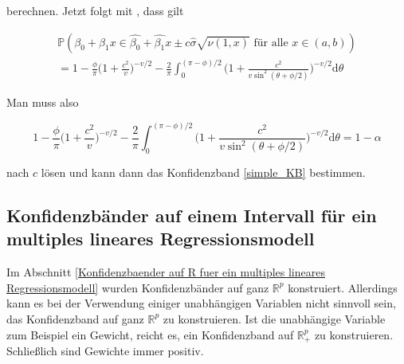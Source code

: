 \documentclass[12pt,a4paper]{article}
\theoremstyle{definition}
\theoremstyle{definition}
\theoremstyle{definition}
\theoremstyle{definition}
\begin{document}
berechnen. Jetzt folgt mit \cite{Wynn71}, dass gilt
%
%
%


\begin{eqnarray*}
\mathbb{P} \left( \beta_0 + \beta_1 x \in \hat{\beta_0} + \hat{\beta_1} x \pm c \hat{\sigma} \sqrt{\nu(1,x)} \text{ für alle } x \in (a,b) \right) \\
= 1 - \frac{\phi}{\pi} \biggl( 1 + \frac{c^2}{v} \biggr)^{ - v/2} - \frac{2}{\pi} \int^{(\pi - \phi)/2}_{0} \biggl( 1 + \frac{c^2}{v \sin^2(\theta + \phi/2)} \biggr)^{-v/2} \text{d} \theta
\end{eqnarray*}

Man muss also 

\begin{equation*}
1 - \frac{\phi}{\pi} \biggl( 1 + \frac{c^2}{v} \biggr)^{ - v/2} - \frac{2}{\pi} \int^{(\pi - \phi)/2}_{0} \biggl( 1 + \frac{c^2}{v \sin^2(\theta + \phi/2)} \biggr)^{-v/2} \text{d} \theta = 1 - \alpha
\end{equation*}

nach $c$ lösen und kann dann das Konfidenzband \eqref{simple_KB} bestimmen.





\subsection{Konfidenzbänder auf einem Intervall für ein multiples lineares Regressionsmodell}
\label{Konfidenzbaender auf einem Intervall fuer ein multiples lineares Regressionsmodell}
Im Abschnitt \ref{Konfidenzbaender auf R fuer ein multiples lineares Regressionsmodell} wurden Konfidenzbänder auf ganz $\mathbb{R}^p$ konstruiert. Allerdings kann es bei der Verwendung einiger unabhängigen Variablen nicht sinnvoll sein, das Konfidenzband auf ganz $\mathbb{R}^{p}$ zu konstruieren. Ist die unabhängige Variable zum Beispiel ein Gewicht, reicht es, ein Konfidenzband auf $\mathbb{R}_{+}^{p}$ zu konstruieren. Schließlich sind Gewichte immer positiv.
\end{document}
